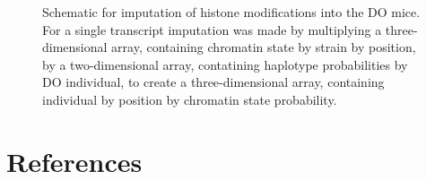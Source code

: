 \documentclass[10pt,letterpaper]{article}
\begin{document}
\begin{figure}[ht]
\centering
\caption{Schematic for imputation of histone modifications into the 
DO mice. For a single transcript imputation was made by multiplying 
a three-dimensional array, containing chromatin state by strain by
position, by a two-dimensional array, contatining haplotype probabilities
by DO individual, to create a three-dimensional array, containing 
individual by position by chromatin state probability.}
\label{supp_fig:imputation}
\end{figure}

\hypertarget{references}{%
\section*{References}\label{references}}
\end{document}
